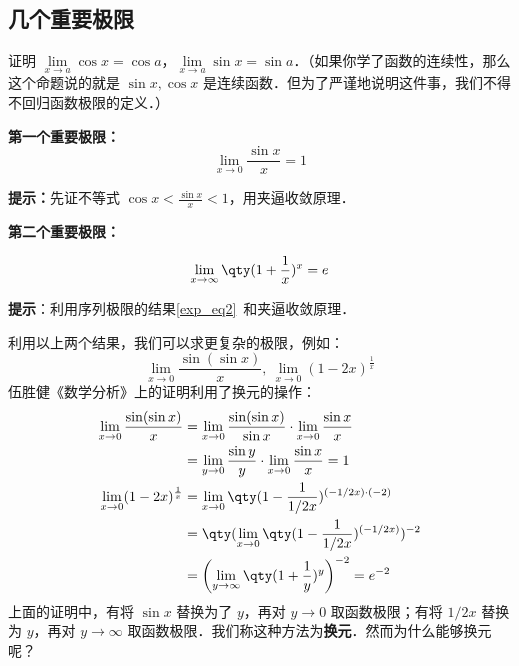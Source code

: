 \subsection{几个重要极限}
\begin{exercise}{}
证明 $\lim\limits_{x\rightarrow a}\cos x=\cos a$，$\lim\limits_{x\rightarrow a}\sin x=\sin a$．（如果你学了函数的连续性，那么这个命题说的就是 $\sin x,\cos x$ 是连续函数．但为了严谨地说明这件事，我们不得不回归函数极限的定义．）
\end{exercise}

\textbf{第一个重要极限：}
\begin{equation}
\lim\limits_{x\rightarrow 0}\frac{\sin x}{x}=1
\end{equation}

\textbf{提示：}先证不等式 $\cos x<\frac{\sin x}{x}<1$，用夹逼收敛原理．

\textbf{第二个重要极限：}

\begin{equation}
\lim\limits_{x\rightarrow \infty} \qty(1+\frac{1}{x})^x=e
\end{equation}

\textbf{提示}：利用序列极限的结果\autoref{exp_eq2}~和夹逼收敛原理．

利用以上两个结果，我们可以求更复杂的极限，例如：
\begin{equation}
\lim\limits_{x\rightarrow 0}\frac{\sin(\sin x)}{x},\ \lim\limits_{x\rightarrow 0}(1-2x)^{\frac{1}{x}}
\end{equation}
伍胜健《数学分析》上的证明利用了换元的操作：
\begin{equation}
\begin{aligned}
\lim\limits_{x\rightarrow 0}\frac{\sin(\sin x)}{x}&=\lim\limits_{x\rightarrow 0}\frac{\sin(\sin x)}{\sin x}\cdot \lim\limits_{x\rightarrow 0}\frac{\sin x}{x}\\
&=\lim\limits_{y\rightarrow 0}\frac{\sin y}{y}\cdot \lim\limits_{x\rightarrow 0}\frac{\sin x}{x}=1\\
\lim\limits_{x\rightarrow 0}(1-2x)^{\frac{1}{x}}&=\lim\limits_{x\rightarrow 0}\qty(1-\frac{1}{1/2x})^{(-1/2x)\cdot (-2)}\\&=\qty(\lim\limits_{x\rightarrow 0}\qty(1-\frac{1}{1/2x})^{(-1/2x)})^{-2}
\\&=\left(\lim\limits_{y\rightarrow \infty}\qty(1+\frac{1}{y})^{y}\right)^{-2}=e^{-2}
\end{aligned}
\end{equation}
上面的证明中，有将 $\sin x$ 替换为了 $y$，再对 $y\rightarrow 0$ 取函数极限；有将 $1/2x$ 替换为 $y$，再对 $y\rightarrow \infty$ 取函数极限．我们称这种方法为\textbf{换元}．然而为什么能够换元呢？

